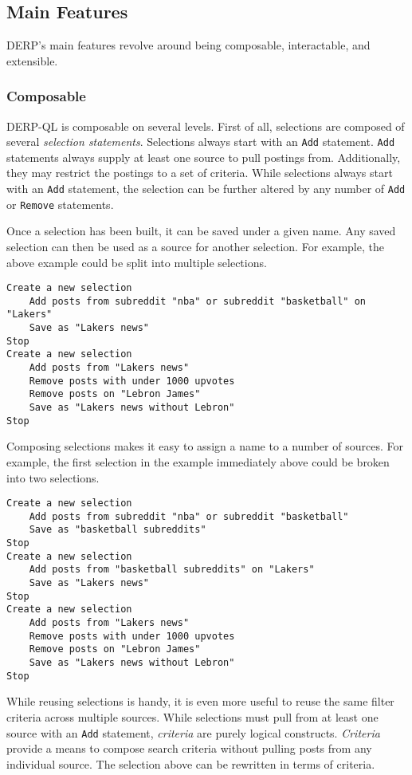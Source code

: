\subsection{Main Features}
DERP's main features revolve around being composable, interactable, and extensible.
\subsubsection{Composable}
\label{subsub:Composable}
DERP-QL is composable on several levels. First of all, selections are composed of several \textit{selection statements}.
Selections always start with an \texttt{Add} statement. \texttt{Add} statements always supply at least one source to pull postings from. Additionally, they may restrict the postings to a set of criteria. While selections always start with an \texttt{Add} statement, the selection can be further altered by any number of \texttt{Add} or \texttt{Remove} statements. 

Once a selection has been built, it can be saved under a given name. Any saved selection can then be used as a source for another selection. For example, the above example could be split into multiple selections.

\begin{lstlisting}
Create a new selection
    Add posts from subreddit "nba" or subreddit "basketball" on "Lakers"
    Save as "Lakers news"
Stop
Create a new selection
    Add posts from "Lakers news"
    Remove posts with under 1000 upvotes
    Remove posts on "Lebron James"
    Save as "Lakers news without Lebron"
Stop
\end{lstlisting}

Composing selections makes it easy to assign a name to a number of sources. For example, the first selection in the example immediately above could be broken into two selections.

\begin{lstlisting}
Create a new selection
    Add posts from subreddit "nba" or subreddit "basketball" 
    Save as "basketball subreddits"
Stop
Create a new selection
    Add posts from "basketball subreddits" on "Lakers"
    Save as "Lakers news"
Stop
Create a new selection
    Add posts from "Lakers news"
    Remove posts with under 1000 upvotes
    Remove posts on "Lebron James"
    Save as "Lakers news without Lebron"
Stop
\end{lstlisting}

While reusing selections is handy, it is even more useful to reuse the same filter criteria across multiple sources.
While selections must pull from at least one source with an \texttt{Add} statement, \textit{criteria}\label{create:criteria} are purely logical constructs. \textit{Criteria} provide a means to compose search criteria without pulling posts from any individual source. The selection above can be rewritten in terms of criteria.

